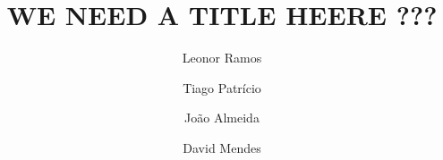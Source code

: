 \title{WE NEED A TITLE HEERE ???}

\author[first]{Leonor Ramos}
\author[second]{Tiago Patrício}
\author[third]{João Almeida}
\author[fourth]{David Mendes}

